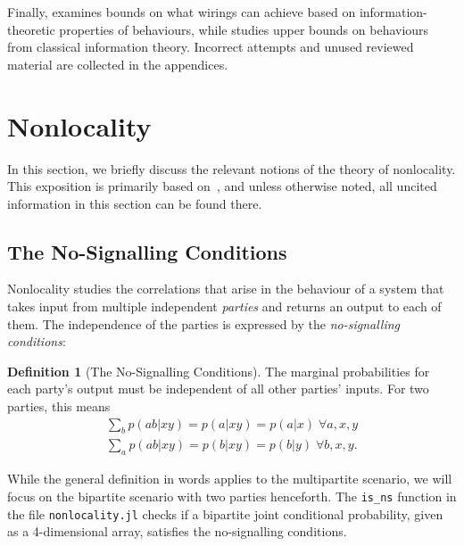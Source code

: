 \documentclass[10pt, a4paper]{article}
\numberwithin{equation}{section} %
\newcounter{stmt} %
\theoremstyle{definition}
\newtheorem{defn}[stmt]{Definition}
\theoremstyle{plain}
\newcommand{\?}{\mathrel{?}} %
\begin{document}
    Finally,  examines bounds on what wirings can achieve based on information-theoretic properties of behaviours, while  studies upper bounds on behaviours from classical information theory. Incorrect attempts and unused reviewed material are collected in the appendices.

    \section{Nonlocality}\label{sec:nl}

    In this section, we briefly discuss the relevant notions of the theory of nonlocality. This exposition is primarily based on~\cite{BellNonlocality}, and unless otherwise noted, all uncited information in this section can be found there.

    \subsection{The No-Signalling Conditions}\label{sec:nl_ns}

    Nonlocality studies the correlations that arise in the behaviour of a system that takes input from multiple independent \emph{parties} and returns an output to each of them. The independence of the parties is expressed by the \emph{no-signalling conditions}:
    \begin{defn}[The No-Signalling Conditions]\label{def:nscond}
      The marginal probabilities for each party's output must be independent of all other parties' inputs. For two parties, this means
      \begin{gather}
        \sum_b p(ab|xy) = p(a|xy) = p(a|x)\;\forall a,x,y \\
        \sum_a p(ab|xy) = p(b|xy) = p(b|y)\;\forall b,x,y.
      \end{gather}
    \end{defn}
    While the general definition in words applies to the multipartite scenario, we will focus on the bipartite scenario with two parties henceforth. The \verb`is_ns` function in the file \verb`nonlocality.jl` checks if a bipartite joint conditional probability, given as a 4-dimensional array, satisfies the no-signalling conditions.
\end{document}
